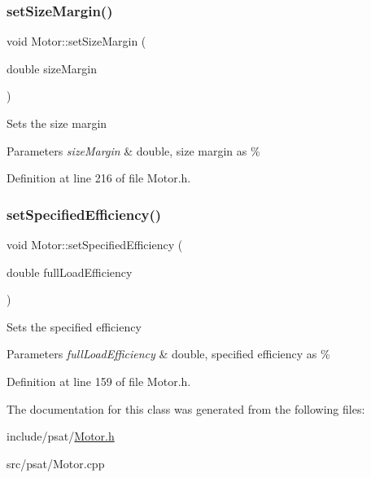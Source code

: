 \mbox{\label{class_motor_ab39a9375d17af151b6f9516674f37928}} 
\subsubsection{\texorpdfstring{set\+Size\+Margin()}{setSizeMargin()}}
{\footnotesize\ttfamily void Motor\+::set\+Size\+Margin (\begin{DoxyParamCaption}\item[{double}]{size\+Margin }\end{DoxyParamCaption})\hspace{0.3cm}{\ttfamily [inline]}}

Sets the size margin


\begin{DoxyParams}{Parameters}
{\em size\+Margin} & double, size margin as \% \\
\hline
\end{DoxyParams}


Definition at line 216 of file Motor.\+h.

\mbox{\label{class_motor_a0a096ec5fc2b7e8ee40b4e7b30e5f337}} 
\subsubsection{\texorpdfstring{set\+Specified\+Efficiency()}{setSpecifiedEfficiency()}}
{\footnotesize\ttfamily void Motor\+::set\+Specified\+Efficiency (\begin{DoxyParamCaption}\item[{double}]{full\+Load\+Efficiency }\end{DoxyParamCaption})\hspace{0.3cm}{\ttfamily [inline]}}

Sets the specified efficiency


\begin{DoxyParams}{Parameters}
{\em full\+Load\+Efficiency} & double, specified efficiency as \% \\
\hline
\end{DoxyParams}


Definition at line 159 of file Motor.\+h.



The documentation for this class was generated from the following files\+:\begin{DoxyCompactItemize}
\item 
include/psat/\hyperlink{_motor_8h}{Motor.\+h}\item 
src/psat/Motor.\+cpp\end{DoxyCompactItemize}
